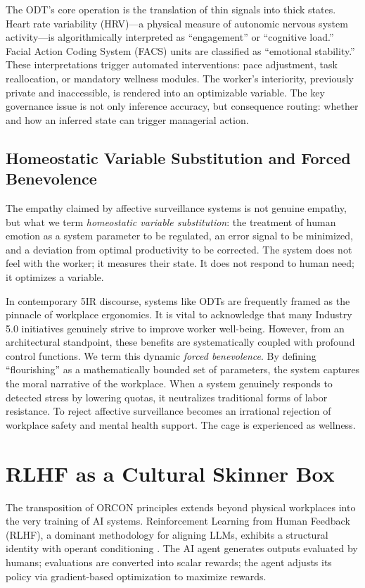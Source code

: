\documentclass[11pt, a4paper]{article}
\begin{document}
The ODT's core operation is the translation of thin signals into thick states. Heart rate variability (HRV)---a physical measure of autonomic nervous system activity---is algorithmically interpreted as ``engagement'' or ``cognitive load.'' Facial Action Coding System (FACS) units are classified as ``emotional stability.'' These interpretations trigger automated interventions: pace adjustment, task reallocation, or mandatory wellness modules. The worker's interiority, previously private and inaccessible, is rendered into an optimizable variable. The key governance issue is not only inference accuracy, but consequence routing: whether and how an inferred state can trigger managerial action.

\subsection{Homeostatic Variable Substitution and Forced Benevolence}
The empathy claimed by affective surveillance systems is not genuine empathy, but what we term \textit{homeostatic variable substitution}: the treatment of human emotion as a system parameter to be regulated, an error signal to be minimized, and a deviation from optimal productivity to be corrected. The system does not feel with the worker; it measures their state. It does not respond to human need; it optimizes a variable.

In contemporary 5IR discourse, systems like ODTs are frequently framed as the pinnacle of workplace ergonomics. It is vital to acknowledge that many Industry 5.0 initiatives genuinely strive to improve worker well-being. However, from an architectural standpoint, these benefits are systematically coupled with profound control functions. We term this dynamic \textit{forced benevolence}. By defining ``flourishing'' as a mathematically bounded set of parameters, the system captures the moral narrative of the workplace. When a system genuinely responds to detected stress by lowering quotas, it neutralizes traditional forms of labor resistance. To reject affective surveillance becomes an irrational rejection of workplace safety and mental health support. The cage is experienced as wellness.

\section{RLHF as a Cultural Skinner Box}

The transposition of ORCON principles extends beyond physical workplaces into the very training of AI systems. Reinforcement Learning from Human Feedback (RLHF), a dominant methodology for aligning LLMs, exhibits a structural identity with operant conditioning \cite{christiano2017,ouyang2022,sutton2018}. The AI agent generates outputs evaluated by humans; evaluations are converted into scalar rewards; the agent adjusts its policy via gradient-based optimization to maximize rewards.
\end{document}
